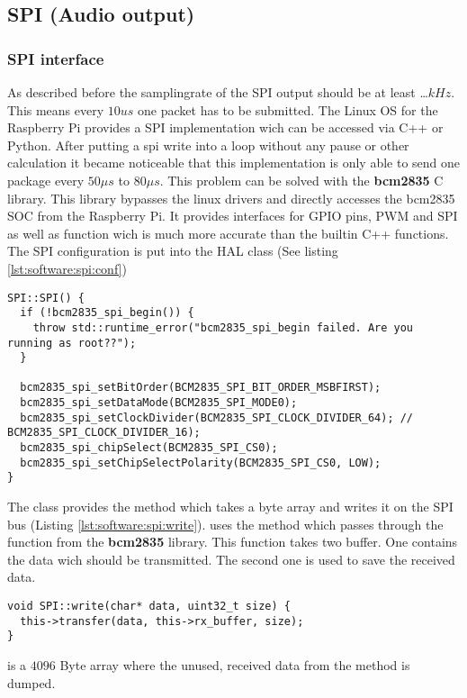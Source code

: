 \subsection{SPI (Audio output)}

\subsubsection*{SPI interface}

As described before the samplingrate of the SPI output should be at least \dots$kHz$. This means every $10us$ one packet has to be submitted. The Linux OS for the Raspberry Pi provides a SPI implementation wich can be accessed via C++ or Python. After putting a spi write into a loop without any pause or other calculation it became noticeable that this implementation is only able to send one package every $50\mu s$ to $80\mu s$. This problem can be solved with the \textbf{bcm2835} C library.\cite{mccauley_bcm2835_nodate} This library bypasses the linux drivers and directly accesses the bcm2835 SOC from the Raspberry Pi. It provides interfaces for GPIO pins, PWM and SPI as well as  function wich is much more accurate than the builtin C++ functions.\p
%
The SPI configuration is put into the HAL class  (See listing \ref{lst:software:spi:conf})
%
\begin{mdframed}
\begin{lstlisting}[caption=SPI configuration, label=lst:software:spi:conf]
SPI::SPI() {
  if (!bcm2835_spi_begin()) {
    throw std::runtime_error("bcm2835_spi_begin failed. Are you running as root??");
  }

  bcm2835_spi_setBitOrder(BCM2835_SPI_BIT_ORDER_MSBFIRST);
  bcm2835_spi_setDataMode(BCM2835_SPI_MODE0);
  bcm2835_spi_setClockDivider(BCM2835_SPI_CLOCK_DIVIDER_64); // BCM2835_SPI_CLOCK_DIVIDER_16);
  bcm2835_spi_chipSelect(BCM2835_SPI_CS0);
  bcm2835_spi_setChipSelectPolarity(BCM2835_SPI_CS0, LOW);
}
\end{lstlisting}
\end{mdframed}
%
The  class provides the method  which takes a byte array and writes it on the SPI bus (Listing \ref{lst:software:spi:write}).  uses the method  which passes through the function  from the \textbf{bcm2835} library. This function takes two buffer. One contains the data wich should be transmitted. The second one is used to save the received data.
%
\begin{mdframed}
\begin{lstlisting}[caption=Method for writing data onto the SPI bus, label=lst:software:spi:write]
void SPI::write(char* data, uint32_t size) {
  this->transfer(data, this->rx_buffer, size);
}
\end{lstlisting}
\end{mdframed}
%
 is a $4096$ Byte array where the unused, received data from the  method is dumped.
%
